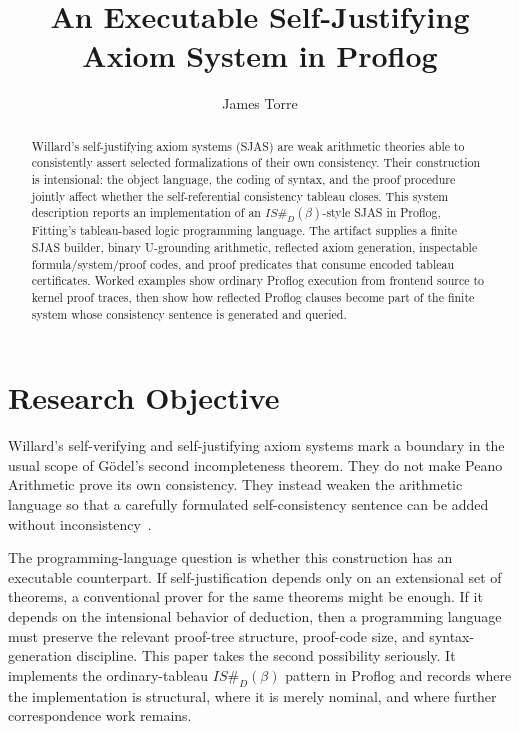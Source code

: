 \documentclass[runningheads]{llncs}
\title{An Executable Self-Justifying Axiom System in Proflog}
\author{James Torre}
\institute{\email{jpt4@proton.me}}
\begin{document}
\maketitle

\begin{abstract}
Willard's self-justifying axiom systems (SJAS) are weak arithmetic
theories able to consistently assert selected formalizations of their own
consistency.  Their construction is intensional: the object language,
the coding of syntax, and the proof procedure jointly affect whether the
self-referential consistency tableau closes.  This system description reports
an implementation of an \(IS\#_D(\beta)\)-style SJAS in Proflog, Fitting's
tableau-based logic programming language.  The artifact supplies a finite SJAS
builder, binary U-grounding arithmetic, reflected axiom generation,
inspectable formula/system/proof codes, and proof predicates that consume
encoded tableau certificates.  Worked examples show ordinary Proflog execution
from frontend source to kernel proof traces, then show how reflected Proflog
clauses become part of the finite system whose consistency sentence is
generated and queried.
\end{abstract}

\section{Research Objective}

Willard's self-verifying and self-justifying axiom systems mark a boundary in
the usual scope of G\"odel's second incompleteness theorem.  They do not make
Peano Arithmetic prove its own consistency.  They instead weaken the arithmetic
language so that a carefully formulated self-consistency sentence can be added
without inconsistency~\cite{willard2001selfverifying,willard2011selfjustifying}.

The programming-language question is whether this construction has an
executable counterpart.  If self-justification depends only on an extensional
set of theorems, a conventional prover for the same theorems might be enough.
If it depends on the intensional behavior of deduction, then a programming
language must preserve the relevant proof-tree structure, proof-code size, and
syntax-generation discipline.  This paper takes the second possibility
seriously.  It implements the ordinary-tableau \(IS\#_D(\beta)\) pattern in
Proflog and records where the implementation is structural, where it is merely
nominal, and where further correspondence work remains.
\end{document}
